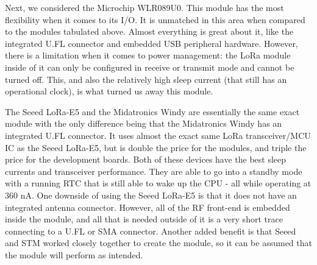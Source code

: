 Next, we considered the Microchip WLR089U0. This module has the most flexibility
when it comes to its I/O. It is unmatched in this area when compared to the
modules tabulated above. Almost everything is great about it, like the
integrated U.FL connector and embedded USB peripheral hardware. However, there
is a limitation when it comes to power management: the LoRa module inside of it
can only be configured in receive or transmit mode and cannot be turned off.
This, and also the relatively high sleep current (that still has an operational
clock), is what turned us away this module.

The Seeed LoRa-E5 and the Midatronics Windy are essentially the same exact
module with the only difference being that the Midatronics Windy has an
integrated U.FL connector. It uses almost the exact same LoRa transceiver/MCU IC
as the Seeed LoRa-E5, but is double the price for the modules, and triple the
price for the development boards. Both of these devices have the best sleep
currents and transceiver performance. They are able to go into a standby mode
with a running RTC that is still able to wake up the CPU - all while operating
at 360 nA. One downside of using the Seeed LoRa-E5 is that it does not have an
integrated antenna connector. However, all of the RF front-end is embedded
inside the module, and all that is needed outside of it is a very short trace
connecting to a U.FL or SMA connector. Another added benefit is that Seeed and
STM worked closely together to create the module, so it can be assumed that the
module will perform as intended.
